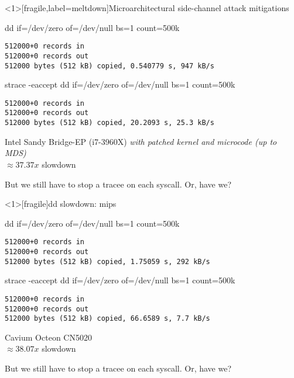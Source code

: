 \documentclass[unicode,aspectratio=169]{beamer}
\begin{document}
\begin{frame}<1>[fragile,label=meltdown]{Microarchitectural side-channel attack mitigations}
\begin{block}{\large dd if=/dev/zero of=/dev/null bs=1 count=500k}
\begin{verbatim}
512000+0 records in
512000+0 records out
512000 bytes (512 kB) copied, 0.540779 s, 947 kB/s
\end{verbatim}
\end{block}
\begin{block}{\large strace -eaccept dd if=/dev/zero of=/dev/null bs=1 count=500k}
\begin{verbatim}
512000+0 records in
512000+0 records out
512000 bytes (512 kB) copied, 20.2093 s, 25.3 kB/s
\end{verbatim}
\end{block}
\begin{scriptsize}
Intel Sandy Bridge-EP (i7-3960X) \emph{with patched kernel and microcode (up to MDS)} \\
$\approx 37.37x$ slowdown \\
\end{scriptsize}
\pause
But we still have to stop a tracee on each syscall. Or, have we?
\end{frame}

\begin{frame}<1>[fragile]{dd slowdown: mips}
\begin{block}{\large dd if=/dev/zero of=/dev/null bs=1 count=500k}
\begin{verbatim}
512000+0 records in
512000+0 records out
512000 bytes (512 kB) copied, 1.75059 s, 292 kB/s
\end{verbatim}
\end{block}
\begin{block}{\large strace -eaccept dd if=/dev/zero of=/dev/null bs=1 count=500k}
\begin{verbatim}
512000+0 records in
512000+0 records out
512000 bytes (512 kB) copied, 66.6589 s, 7.7 kB/s
\end{verbatim}
\end{block}
\begin{scriptsize}
Cavium Octeon CN5020 \\
$\approx 38.07x$ slowdown \\
\end{scriptsize}
\pause
But we still have to stop a tracee on each syscall. Or, have we?
\end{frame}
\end{document}
